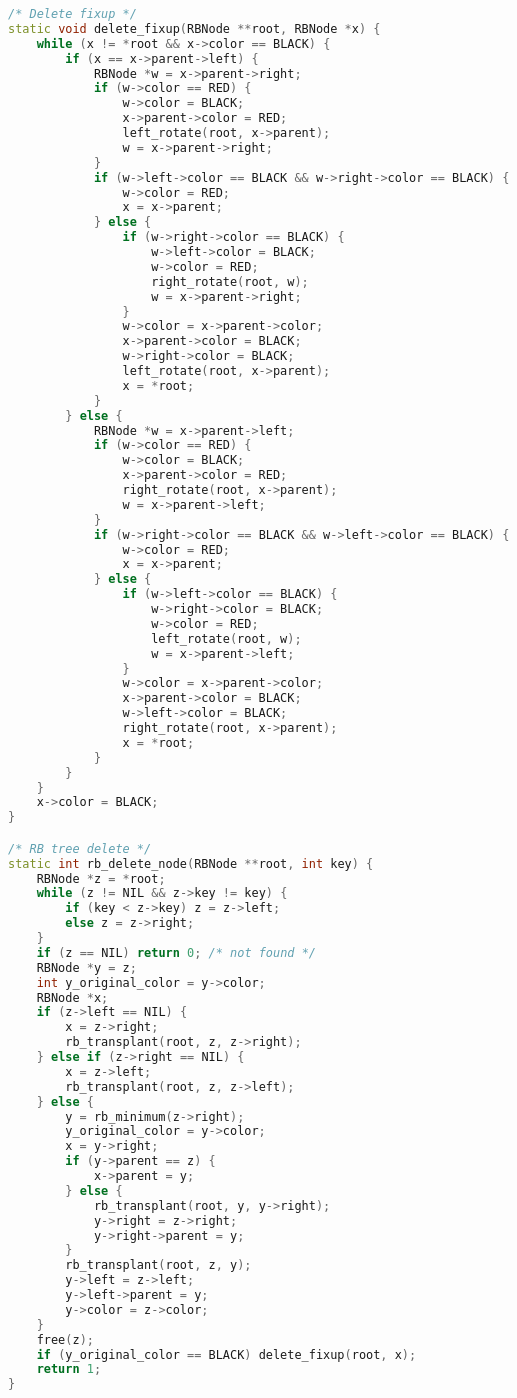 \documentclass[12pt,a4paper]{article}
\begin{document}
\begin{lstlisting}[language=C++]
/* Delete fixup */
static void delete_fixup(RBNode **root, RBNode *x) {
    while (x != *root && x->color == BLACK) {
        if (x == x->parent->left) {
            RBNode *w = x->parent->right;
            if (w->color == RED) {
                w->color = BLACK;
                x->parent->color = RED;
                left_rotate(root, x->parent);
                w = x->parent->right;
            }
            if (w->left->color == BLACK && w->right->color == BLACK) {
                w->color = RED;
                x = x->parent;
            } else {
                if (w->right->color == BLACK) {
                    w->left->color = BLACK;
                    w->color = RED;
                    right_rotate(root, w);
                    w = x->parent->right;
                }
                w->color = x->parent->color;
                x->parent->color = BLACK;
                w->right->color = BLACK;
                left_rotate(root, x->parent);
                x = *root;
            }
        } else {
            RBNode *w = x->parent->left;
            if (w->color == RED) {
                w->color = BLACK;
                x->parent->color = RED;
                right_rotate(root, x->parent);
                w = x->parent->left;
            }
            if (w->right->color == BLACK && w->left->color == BLACK) {
                w->color = RED;
                x = x->parent;
            } else {
                if (w->left->color == BLACK) {
                    w->right->color = BLACK;
                    w->color = RED;
                    left_rotate(root, w);
                    w = x->parent->left;
                }
                w->color = x->parent->color;
                x->parent->color = BLACK;
                w->left->color = BLACK;
                right_rotate(root, x->parent);
                x = *root;
            }
        }
    }
    x->color = BLACK;
}

/* RB tree delete */
static int rb_delete_node(RBNode **root, int key) {
    RBNode *z = *root;
    while (z != NIL && z->key != key) {
        if (key < z->key) z = z->left;
        else z = z->right;
    }
    if (z == NIL) return 0; /* not found */
    RBNode *y = z;
    int y_original_color = y->color;
    RBNode *x;
    if (z->left == NIL) {
        x = z->right;
        rb_transplant(root, z, z->right);
    } else if (z->right == NIL) {
        x = z->left;
        rb_transplant(root, z, z->left);
    } else {
        y = rb_minimum(z->right);
        y_original_color = y->color;
        x = y->right;
        if (y->parent == z) {
            x->parent = y;
        } else {
            rb_transplant(root, y, y->right);
            y->right = z->right;
            y->right->parent = y;
        }
        rb_transplant(root, z, y);
        y->left = z->left;
        y->left->parent = y;
        y->color = z->color;
    }
    free(z);
    if (y_original_color == BLACK) delete_fixup(root, x);
    return 1;
}


\end{lstlisting}
\end{document}
